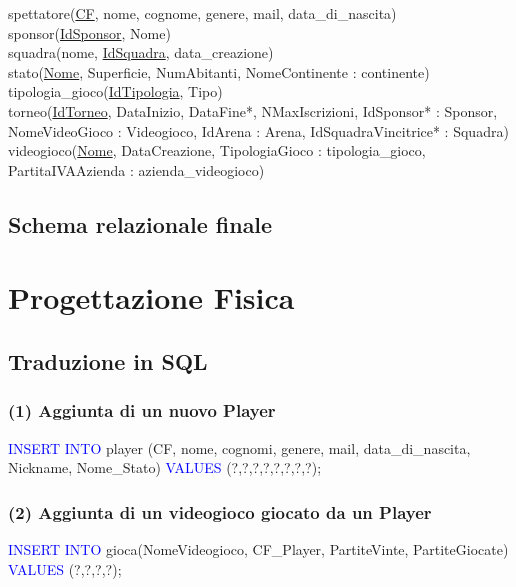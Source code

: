 \documentclass[a4paper,12pt]{report}
\begin{document}
spettatore(\underline{CF}, nome, cognome, genere, mail, data\_di\_nascita) \\

sponsor(\underline{IdSponsor}, Nome) \\

squadra(nome, \underline{IdSquadra}, data\_creazione) \\

stato(\underline{Nome}, Superficie, NumAbitanti, NomeContinente : continente) \\

tipologia\_gioco(\underline{IdTipologia}, Tipo) \\

torneo(\underline{IdTorneo}, DataInizio, DataFine*, NMaxIscrizioni, IdSponsor* : Sponsor, NomeVideoGioco : Videogioco, IdArena : Arena, IdSquadraVincitrice* : Squadra) \\

videogioco(\underline{Nome}, DataCreazione, TipologiaGioco : tipologia\_gioco, PartitaIVAAzienda : azienda\_videogioco) \\







\section{Schema relazionale finale}


\chapter{Progettazione Fisica}
\section{Traduzione in SQL}
\subsection*{(1) Aggiunta di un nuovo Player}
\textcolor{blue}{INSERT INTO} player (CF, nome, cognomi, genere, mail, data\_di\_nascita, Nickname, Nome\_Stato)
\textcolor{blue}{VALUES} (?,?,?,?,?,?,?,?);

\subsection*{(2) Aggiunta di un videogioco giocato da un Player}
\textcolor{blue}{INSERT INTO} gioca(NomeVideogioco, CF\_Player, PartiteVinte, PartiteGiocate)
\textcolor{blue}{VALUES} (?,?,?,?);
\end{document}
